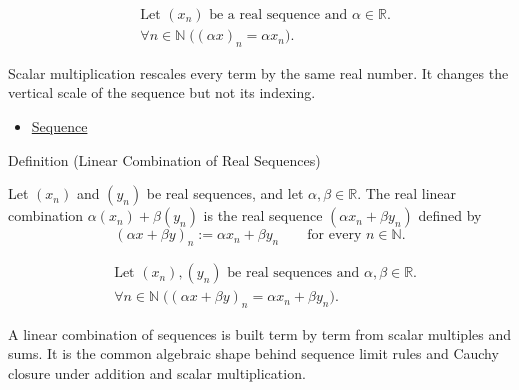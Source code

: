 \begin{remark*}
\[
\begin{aligned}
&\text{Let } (x_n) \text{ be a real sequence and } \alpha\in\mathbb{R}.\\
&\forall n\in\mathbb{N}\;\bigl((\alpha x)_n=\alpha x_n\bigr).
\end{aligned}
\]
\end{remark*}

\begin{remark*}[Interpretation]
Scalar multiplication rescales every term by the same real number. It changes
the vertical scale of the sequence but not its indexing.
\end{remark*}

\begin{dependencies}
\begin{itemize}
  \item \hyperref[def:sequence]{Sequence}
\end{itemize}
\end{dependencies}


\begin{definitionbox}{Definition (Linear Combination of Real Sequences)}
\begin{definition}
\label{def:linear-combination-of-real-sequences}
Let $(x_n)$ and $(y_n)$ be real sequences, and let
$\alpha,\beta\in\mathbb{R}$.  The real linear combination
$\alpha(x_n)+\beta(y_n)$ is the real sequence $(\alpha x_n+\beta y_n)$
defined by
\[
(\alpha x+\beta y)_n := \alpha x_n+\beta y_n
\qquad
\text{for every } n\in\mathbb{N}.
\]
\end{definition}
\end{definitionbox}

\begin{remark*}
\[
\begin{aligned}
&\text{Let } (x_n),(y_n) \text{ be real sequences and }
  \alpha,\beta\in\mathbb{R}.\\
&\forall n\in\mathbb{N}\;\bigl((\alpha x+\beta y)_n
  =\alpha x_n+\beta y_n\bigr).
\end{aligned}
\]
\end{remark*}

\begin{remark*}[Interpretation]
A linear combination of sequences is built term by term from scalar
multiples and sums. It is the common algebraic shape behind sequence limit
rules and Cauchy closure under addition and scalar multiplication.
\end{remark*}


